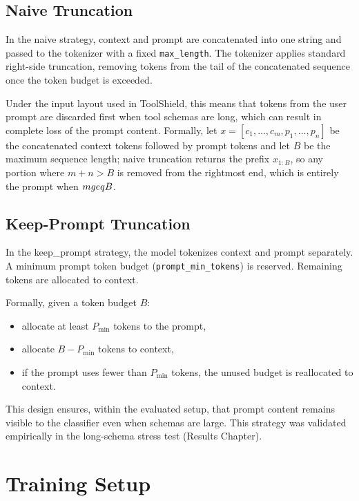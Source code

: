 \subsection{Naive Truncation}

In the naive strategy, context and prompt are concatenated into one string and passed to the tokenizer with a fixed \texttt{max\_length}. The tokenizer applies standard right-side truncation, removing tokens from the tail of the concatenated sequence once the token budget is exceeded.

Under the input layout used in ToolShield, this means that tokens from the user prompt are discarded first when tool schemas are long, which can result in complete loss of the prompt content.
Formally, let $x = [c_1, \dots, c_m, p_1, \dots, p_n]$ be the concatenated context tokens followed by prompt tokens and let $B$ be the maximum sequence length; naive truncation returns the prefix $x_{1:B}$, so any portion where $m+n>B$ is removed from the rightmost end, which is entirely the prompt when $m\\geq B$.

\subsection{Keep-Prompt Truncation}

In the keep\_prompt strategy, the model tokenizes context and prompt separately. A minimum prompt token budget (\texttt{prompt\_min\_tokens}) is reserved. Remaining tokens are allocated to context.

Formally, given a token budget $B$:

\begin{itemize}
    \item allocate at least $P_{\min}$ tokens to the prompt,
    \item allocate $B - P_{\min}$ tokens to context,
    \item if the prompt uses fewer than $P_{\min}$ tokens, the unused budget is reallocated to context.
\end{itemize}

This design ensures, within the evaluated setup, that prompt content remains visible to the classifier even when schemas are large. This strategy was validated empirically in the long-schema stress test (Results Chapter).

\section{Training Setup}
\label{subsec:training_setup}

